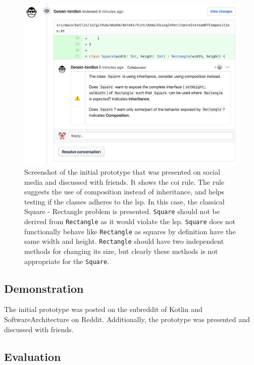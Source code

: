 \documentclass[pdftex,10pt,b5paper,twoside]{report}
\begin{document}
\begin{figure}[h!]
    \centering
    \includegraphics[width=\textwidth]{../images/demo.png}
    \caption{Screenshot of the initial prototype that was presented on social media and discussed with friends. It shows the \gls{coi} rule. The rule suggests the use of composition instead of inheritance, and helps testing if the classes adheres to the \gls{lsp}. In this case, the classical Square - Rectangle problem is presented. \texttt{Square} should not be derived from \texttt{Rectangle} as it would violate the \gls{lsp}. \texttt{Square} does not functionally behave like \texttt{Rectangle} as squares by definition have the same width and height. \texttt{Rectangle} should have two independent methods for changing its size, but clearly these methods is not appropriate for the \texttt{Square}. }
    \label{fig:mockup}
\end{figure}

\subsection*{Demonstration}
The initial prototype was posted on the subreddit of Kotlin\cite{kotlin-reddit} and SoftwareArchitecture\cite{softwarearch-reddit} on Reddit. Additionally, the prototype was presented and discussed with friends. 

\subsection*{Evaluation}
\end{document}
